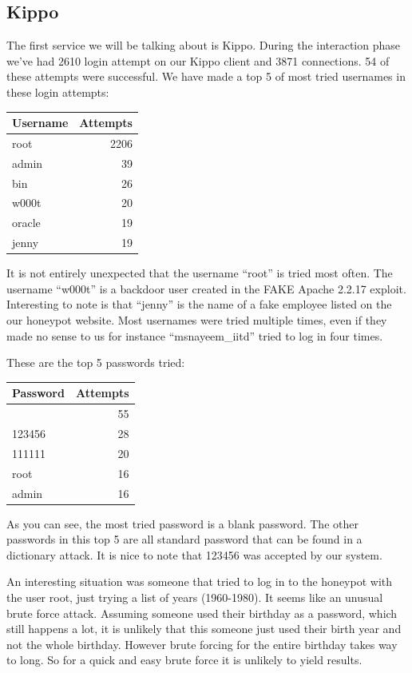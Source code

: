 \documentclass[11pt]{article}
\begin{document}
\subsection{Kippo}

The first service we will be talking about is Kippo. During the interaction phase we've had 2610 login attempt on our Kippo client and 3871 connections. 54 of these attempts were successful.
We have made a top 5 of most tried usernames in these login attempts:

\begin{tabular}{|l|r|}
\hline
Username & Attempts \\ \hline
root & 2206 \\ \hline
admin & 39 \\ \hline
bin & 26 \\ \hline
w000t & 20 \\ \hline
oracle & 19 \\ \hline
jenny & 19 \\ \hline
\end{tabular}

It is not entirely unexpected that the username ``root'' is tried most often. 
The username ``w000t'' is a backdoor user created in the FAKE Apache 2.2.17 exploit.
Interesting to note is that ``jenny'' is the name of a fake employee listed on the our honeypot website.
Most usernames were tried multiple times, even if they made no sense to us for instance ``msnayeem\_iitd'' tried to log in four times.

These are the top 5 passwords tried:

\begin{tabular}{|l|r|}
\hline
Password & Attempts \\ \hline
  & 55 \\ \hline
123456 & 28 \\ \hline
111111 & 20 \\ \hline
root & 16 \\ \hline
admin & 16 \\ \hline
\end{tabular}

As you can see, the most tried password is a blank password. The other passwords in this top 5 are all standard password that can be found in a dictionary attack. It is nice to note that 123456 was accepted by our system.

An interesting situation was someone that tried to log in to the honeypot with the user root, just trying a list of years (1960-1980). It seems like an unusual brute force attack. Assuming someone used their birthday as a password, which still happens a lot, it is unlikely that this someone just used their birth year and not the whole birthday. However brute forcing for the entire birthday takes way to long. So for a quick and easy brute force it is unlikely to yield results.
\end{document}
